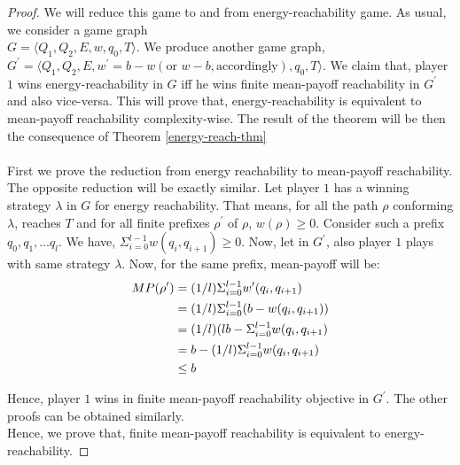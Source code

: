 \begin{proof}
We will reduce this game to and from energy-reachability game. As usual, we consider a game graph\\ $G=\langle Q_1, Q_2, E, w, q_0,T\rangle$. We produce another game graph, $G^{\prime}=\langle Q_1, Q_2, E, w^{\prime}= b-w (\text{or } w-b, \text{accordingly}), q_0,T\rangle$. We claim that, player $1$ wins energy-reachability in $G$ iff he wins finite mean-payoff reachability in $G^{\prime}$ and also vice-versa. This will prove that, energy-reachability is equivalent to mean-payoff reachability complexity-wise. The result of the theorem will be then the consequence of Theorem \ref{energy-reach-thm}\\
\\First we prove the reduction from energy reachability to mean-payoff reachability. The opposite reduction will be exactly similar. Let player $1$ has a winning strategy $\lambda$ in $G$ for energy reachability. That means, for all the path $\rho$ conforming $\lambda$, reaches $T$ and for all finite prefixes $\rho^{\prime}$ of $\rho$, $w(\rho)\geq 0$. Consider such a prefix $q_0,q_1,\ldots q_l$. We have, $\Sigma_{i=0}^{l-1} w(q_i,q_{i+1}) \geq 0$. Now, let in $G^{\prime}$, also player $1$ plays with same strategy $\lambda$. Now, for the same prefix, mean-payoff will be:
\begin{equation}
\begin{align*}
\notag
\centering
MP(\rho^{\prime})&= (1/l)\Sigma_{i=0}^{l-1} w^{\prime}(q_i,q_{i+1})\\
&=(1/l)\Sigma_{i=0}^{l-1} (b- w(q_i,q_{i+1}))\\
&=(1/l)(lb- \Sigma_{i=0}^{l-1} w(q_i,q_{i+1})\\
&=b- (1/l)\Sigma_{i=0}^{l-1} w(q_i,q_{i+1})\\
&\leq b
\end{align*}
\end{equation}

Hence, player $1$ wins in finite mean-payoff reachability objective in $G^{\prime}$. The other proofs can be obtained similarly.\\
Hence, we prove that, finite mean-payoff reachability is equivalent to energy-reachability.

\end{proof}

